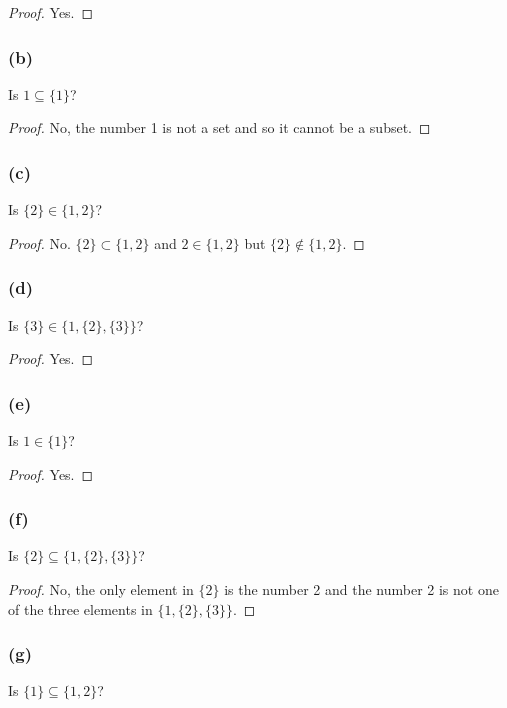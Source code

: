 \documentclass[14pt]{extarticle}
\begin{document}
\begin{proof}
Yes.
\end{proof}

\subsubsection{(b)}
Is $1 \subseteq \{1\}$?

\begin{proof}
No, the number 1 is not a set and so it cannot be a subset.
\end{proof}

\subsubsection{(c)}
Is $\{2\} \in \{1, 2\}$?

\begin{proof}
No. $\{2\} \subset \{1, 2\}$ and $2 \in \{1, 2\}$ but $\{2\} \notin \{1, 2\}$.
\end{proof}

\subsubsection{(d)}
Is $\{3\} \in \{1, \{2\}, \{3\}\}$?

\begin{proof}
Yes.
\end{proof}

\subsubsection{(e)}
Is $1 \in \{1\}$?

\begin{proof}
Yes.
\end{proof}

\subsubsection{(f)}
Is $\{2\} \subseteq \{1, \{2\}, \{3\}\}$?

\begin{proof}
No, the only element in $\{2\}$ is the number 2 and the number 2 is not one of
the three elements in $\{1, \{2\}, \{3\}\}$.
\end{proof}

\subsubsection{(g)}
Is $\{1\} \subseteq \{1, 2\}$?
\end{document}
